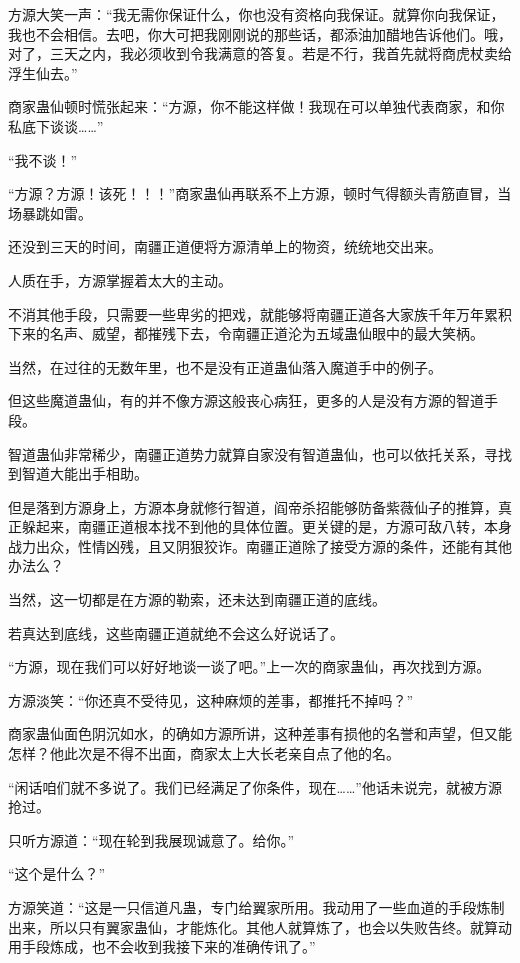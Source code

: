 \begin{this_body}
方源大笑一声：“我无需你保证什么，你也没有资格向我保证。就算你向我保证，我也不会相信。去吧，你大可把我刚刚说的那些话，都添油加醋地告诉他们。哦，对了，三天之内，我必须收到令我满意的答复。若是不行，我首先就将商虎杖卖给浮生仙去。”

商家蛊仙顿时慌张起来：“方源，你不能这样做！我现在可以单独代表商家，和你私底下谈谈……”

“我不谈！”

“方源？方源！该死！！！”商家蛊仙再联系不上方源，顿时气得额头青筋直冒，当场暴跳如雷。

还没到三天的时间，南疆正道便将方源清单上的物资，统统地交出来。

人质在手，方源掌握着太大的主动。

不消其他手段，只需要一些卑劣的把戏，就能够将南疆正道各大家族千年万年累积下来的名声、威望，都摧残下去，令南疆正道沦为五域蛊仙眼中的最大笑柄。

当然，在过往的无数年里，也不是没有正道蛊仙落入魔道手中的例子。

但这些魔道蛊仙，有的并不像方源这般丧心病狂，更多的人是没有方源的智道手段。

智道蛊仙非常稀少，南疆正道势力就算自家没有智道蛊仙，也可以依托关系，寻找到智道大能出手相助。

但是落到方源身上，方源本身就修行智道，阎帝杀招能够防备紫薇仙子的推算，真正躲起来，南疆正道根本找不到他的具体位置。更关键的是，方源可敌八转，本身战力出众，性情凶残，且又阴狠狡诈。南疆正道除了接受方源的条件，还能有其他办法么？

当然，这一切都是在方源的勒索，还未达到南疆正道的底线。

若真达到底线，这些南疆正道就绝不会这么好说话了。

“方源，现在我们可以好好地谈一谈了吧。”上一次的商家蛊仙，再次找到方源。

方源淡笑：“你还真不受待见，这种麻烦的差事，都推托不掉吗？”

商家蛊仙面色阴沉如水，的确如方源所讲，这种差事有损他的名誉和声望，但又能怎样？他此次是不得不出面，商家太上大长老亲自点了他的名。

“闲话咱们就不多说了。我们已经满足了你条件，现在……”他话未说完，就被方源抢过。

只听方源道：“现在轮到我展现诚意了。给你。”

“这个是什么？”

方源笑道：“这是一只信道凡蛊，专门给翼家所用。我动用了一些血道的手段炼制出来，所以只有翼家蛊仙，才能炼化。其他人就算炼了，也会以失败告终。就算动用手段炼成，也不会收到我接下来的准确传讯了。”


\end{this_body}

